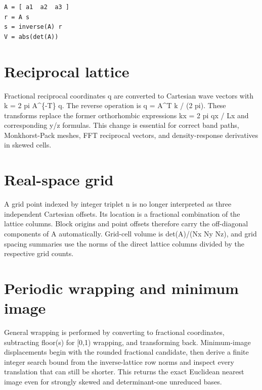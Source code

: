 \documentclass[10pt,a4paper]{report}
\begin{document}
\begin{lstlisting}
A = [ a1  a2  a3 ]
r = A s
s = inverse(A) r
V = abs(det(A))
\end{lstlisting}
\section{Reciprocal lattice}
Fractional reciprocal coordinates q are converted to Cartesian wave vectors with k = 2 pi A\textasciicircum{}\{-T\} q. The reverse operation is q = A\textasciicircum{}T k / (2 pi). These transforms replace the former orthorhombic expressions kx = 2 pi qx / Lx and corresponding y/z formulas. This change is essential for correct band paths, Monkhorst-Pack meshes, FFT reciprocal vectors, and density-response derivatives in skewed cells.

\section{Real-space grid}
A grid point indexed by integer triplet n is no longer interpreted as three independent Cartesian offsets. Its location is a fractional combination of the lattice columns. Block origins and point offsets therefore carry the off-diagonal components of A automatically. Grid-cell volume is det(A)/(Nx Ny Nz), and grid spacing summaries use the norms of the direct lattice columns divided by the respective grid counts.

\section{Periodic wrapping and minimum image}
General wrapping is performed by converting to fractional coordinates, subtracting floor(s) for [0,1) wrapping, and transforming back. Minimum-image displacements begin with the rounded fractional candidate, then derive a finite integer search bound from the inverse-lattice row norms and inspect every translation that can still be shorter. This returns the exact Euclidean nearest image even for strongly skewed and determinant-one unreduced bases.

\begin{center}\end{center}
\end{document}
